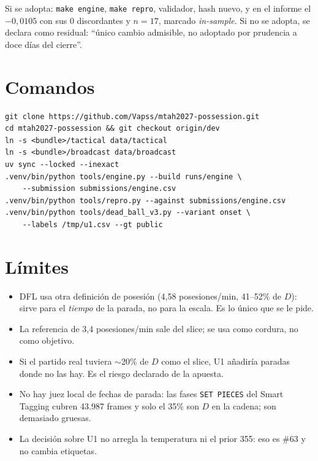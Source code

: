 \documentclass[11pt,a4paper]{article}
\begin{document}
Si se adopta: \texttt{make engine}, \texttt{make repro}, validador, hash nuevo, y en el informe el
$-0{,}0105$ con sus 0 discordantes y $n=17$, marcado \emph{in-sample}. Si no se adopta, se declara
como residual: ``único cambio admisible, no adoptado por prudencia a doce días del cierre''.

\section{Comandos}

\begin{verbatim}
git clone https://github.com/Vapss/mtah2027-possession.git
cd mtah2027-possession && git checkout origin/dev
ln -s <bundle>/tactical data/tactical
ln -s <bundle>/broadcast data/broadcast
uv sync --locked --inexact
.venv/bin/python tools/engine.py --build runs/engine \
    --submission submissions/engine.csv
.venv/bin/python tools/repro.py --against submissions/engine.csv
.venv/bin/python tools/dead_ball_v3.py --variant onset \
    --labels /tmp/u1.csv --gt public
\end{verbatim}

\section{Límites}

\begin{itemize}
\item DFL usa otra definición de posesión (4,58 posesiones/min, 41--52\% de $D$): sirve para el
      \emph{tiempo} de la parada, no para la escala. Es lo único que se le pide.
\item La referencia de 3,4 posesiones/min sale del slice; se usa como cordura, no como objetivo.
\item Si el partido real tuviera $\sim$20\% de $D$ como el slice, U1 añadiría paradas donde no las
      hay. Es el riesgo declarado de la apuesta.
\item No hay juez local de fechas de parada: las fases \texttt{SET PIECES} del Smart Tagging cubren
      43.987 frames y solo el 35\% son $D$ en la cadena; son demasiado gruesas.
\item La decisión sobre U1 no arregla la temperatura ni el prior 355: eso es \#63 y no cambia
      etiquetas.
\end{itemize}
\end{document}
